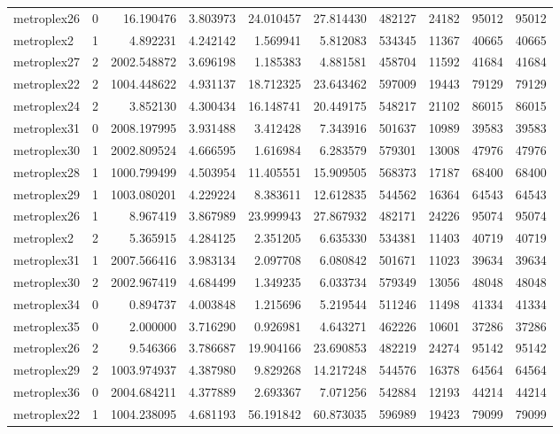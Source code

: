 \documentclass[../../../thesis.tex]{subfiles}
\begin{document}
\begin{longtable}{|l|r|r|r|r|r|r|r|r|r|}
metroplex26 & 0 & 16.190476 & 3.803973 & 24.010457 & 27.814430 & 482127 & 24182 & 95012 & 95012 \\
metroplex2 & 1 & 4.892231 & 4.242142 & 1.569941 & 5.812083 & 534345 & 11367 & 40665 & 40665 \\
metroplex27 & 2 & 2002.548872 & 3.696198 & 1.185383 & 4.881581 & 458704 & 11592 & 41684 & 41684 \\
metroplex22 & 2 & 1004.448622 & 4.931137 & 18.712325 & 23.643462 & 597009 & 19443 & 79129 & 79129 \\
metroplex24 & 2 & 3.852130 & 4.300434 & 16.148741 & 20.449175 & 548217 & 21102 & 86015 & 86015 \\
metroplex31 & 0 & 2008.197995 & 3.931488 & 3.412428 & 7.343916 & 501637 & 10989 & 39583 & 39583 \\
metroplex30 & 1 & 2002.809524 & 4.666595 & 1.616984 & 6.283579 & 579301 & 13008 & 47976 & 47976 \\
metroplex28 & 1 & 1000.799499 & 4.503954 & 11.405551 & 15.909505 & 568373 & 17187 & 68400 & 68400 \\
metroplex29 & 1 & 1003.080201 & 4.229224 & 8.383611 & 12.612835 & 544562 & 16364 & 64543 & 64543 \\
metroplex26 & 1 & 8.967419 & 3.867989 & 23.999943 & 27.867932 & 482171 & 24226 & 95074 & 95074 \\
metroplex2 & 2 & 5.365915 & 4.284125 & 2.351205 & 6.635330 & 534381 & 11403 & 40719 & 40719 \\
metroplex31 & 1 & 2007.566416 & 3.983134 & 2.097708 & 6.080842 & 501671 & 11023 & 39634 & 39634 \\
metroplex30 & 2 & 2002.967419 & 4.684499 & 1.349235 & 6.033734 & 579349 & 13056 & 48048 & 48048 \\
metroplex34 & 0 & 0.894737 & 4.003848 & 1.215696 & 5.219544 & 511246 & 11498 & 41334 & 41334 \\
metroplex35 & 0 & 2.000000 & 3.716290 & 0.926981 & 4.643271 & 462226 & 10601 & 37286 & 37286 \\
metroplex26 & 2 & 9.546366 & 3.786687 & 19.904166 & 23.690853 & 482219 & 24274 & 95142 & 95142 \\
metroplex29 & 2 & 1003.974937 & 4.387980 & 9.829268 & 14.217248 & 544576 & 16378 & 64564 & 64564 \\
metroplex36 & 0 & 2004.684211 & 4.377889 & 2.693367 & 7.071256 & 542884 & 12193 & 44214 & 44214 \\
metroplex22 & 1 & 1004.238095 & 4.681193 & 56.191842 & 60.873035 & 596989 & 19423 & 79099 & 79099 \\

\end{longtable}
\end{document}
